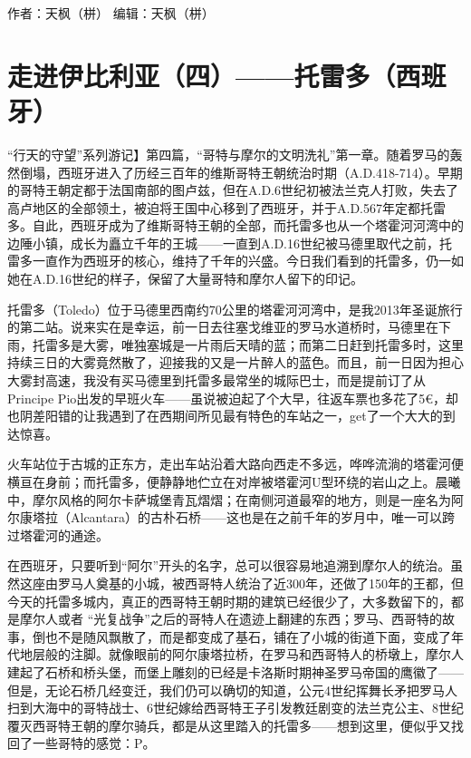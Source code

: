 \documentclass[]{book}
\begin{document}
作者：天枫（栟）
编辑：天枫（栟）

\hypertarget{ux8d70ux8fdbux4f0aux6bd4ux5229ux4e9aux56dbux6258ux96f7ux591aux897fux73edux7259}{%
\section{走进伊比利亚（四）------托雷多（西班牙）}\label{ux8d70ux8fdbux4f0aux6bd4ux5229ux4e9aux56dbux6258ux96f7ux591aux897fux73edux7259}}

``行天的守望''系列游记】第四篇，``哥特与摩尔的文明洗礼''第一章。随着罗马的轰然倒塌，西班牙进入了历经三百年的维斯哥特王朝统治时期（A.D.418-714）。早期的哥特王朝定都于法国南部的图卢兹，但在A.D.6世纪初被法兰克人打败，失去了高卢地区的全部领土，被迫将王国中心移到了西班牙，并于A.D.567年定都托雷多。自此，西班牙成为了维斯哥特王朝的全部，而托雷多也从一个塔霍河河湾中的边陲小镇，成长为矗立千年的王城------一直到A.D.16世纪被马德里取代之前，托雷多一直作为西班牙的核心，维持了千年的兴盛。今日我们看到的托雷多，仍一如她在A.D.16世纪的样子，保留了大量哥特和摩尔人留下的印记。

托雷多（Toledo）位于马德里西南约70公里的塔霍河河湾中，是我2013年圣诞旅行的第二站。说来实在是幸运，前一日去往塞戈维亚的罗马水道桥时，马德里在下雨，托雷多是大雾，唯独塞城是一片雨后天晴的蓝；而第二日赶到托雷多时，这里持续三日的大雾竟然散了，迎接我的又是一片醉人的蓝色。而且，前一日因为担心大雾封高速，我没有买马德里到托雷多最常坐的城际巴士，而是提前订了从Principe Pio出发的早班火车------虽说被迫起了个大早，往返车票也多花了5€，却也阴差阳错的让我遇到了在西期间所见最有特色的车站之一，get了一个大大的到达惊喜。

火车站位于古城的正东方，走出车站沿着大路向西走不多远，哗哗流淌的塔霍河便横亘在身前；而托雷多，便静静地伫立在对岸被塔霍河U型环绕的岩山之上。晨曦中，摩尔风格的阿尔卡萨城堡青瓦熠熠；在南侧河道最窄的地方，则是一座名为阿尔康塔拉（Alcantara）的古朴石桥------这也是在之前千年的岁月中，唯一可以跨过塔霍河的通途。

在西班牙，只要听到``阿尔''开头的名字，总可以很容易地追溯到摩尔人的统治。虽然这座由罗马人奠基的小城，被西哥特人统治了近300年，还做了150年的王都，但今天的托雷多城内，真正的西哥特王朝时期的建筑已经很少了，大多数留下的，都是摩尔人或者 ``光复战争''之后的哥特人在遗迹上翻建的东西；罗马、西哥特的故事，倒也不是随风飘散了，而是都变成了基石，铺在了小城的街道下面，变成了年代地层般的注脚。就像眼前的阿尔康塔拉桥，在罗马和西哥特人的桥墩上，摩尔人建起了石桥和桥头堡，而堡上雕刻的已经是卡洛斯时期神圣罗马帝国的鹰徽了------但是，无论石桥几经变迁，我们仍可以确切的知道，公元4世纪挥舞长矛把罗马人扫到大海中的哥特战士、6世纪嫁给西哥特王子引发教廷剧变的法兰克公主、8世纪覆灭西哥特王朝的摩尔骑兵，都是从这里踏入的托雷多------想到这里，便似乎又找回了一些哥特的感觉：P。
\end{document}
